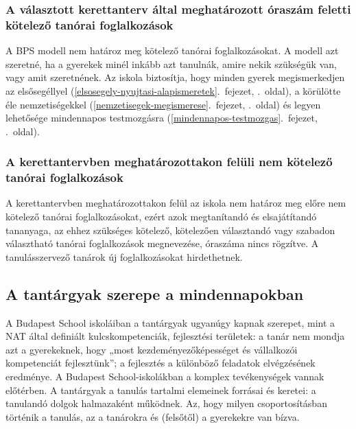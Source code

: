 \hypertarget{a-valasztott-kerettanterv-altal-meghatarozott-oraszam-feletti-kotelezo-tanorai-foglalkozasok}{%
\subsubsection{A választott kerettanterv által meghatározott óraszám
feletti kötelező tanórai
foglalkozások}\label{a-valasztott-kerettanterv-altal-meghatarozott-oraszam-feletti-kotelezo-tanorai-foglalkozasok}}

A BPS modell nem határoz meg kötelező tanórai foglalkozásokat. A modell
azt szeretné, ha a gyerekek minél inkább azt tanulnák, amire nekik
szükségük van, vagy amit szeretnének. Az iskola biztosítja, hogy minden
gyerek megismerkedjen az
elsősegéllyel (\ref{elsosegely-nyujtasi-alapismeretek}.~fejezet, \pageref{elsosegely-nyujtasi-alapismeretek}.~oldal),
a körülötte éle
nemzetiségekkel (\ref{nemzetisegek-megismerese}.~fejezet, \pageref{nemzetisegek-megismerese}.~oldal)
és legyen lehetősége
mindennapos testmozgásra (\ref{mindennapos-testmozgas}.~fejezet, \pageref{mindennapos-testmozgas}.~oldal).

\hypertarget{a-kerettantervben-meghatarozottakon-felul-a-nem-kotelezo-tanorai-foglalkozasok}{%
\subsubsection{A kerettantervben meghatározottakon felüli nem kötelező
tanórai
foglalkozások}\label{a-kerettantervben-meghatarozottakon-felul-a-nem-kotelezo-tanorai-foglalkozasok}}

A kerettantervben meghatározottakon felül az iskola nem határoz meg
előre nem kötelező tanórai foglalkozásokat, ezért azok megtanítandó és
elsajátítandó tananyaga, az ehhez szükséges kötelező, kötelezően
választandó vagy szabadon választható tanórai foglalkozások megnevezése,
óraszáma nincs rögzítve. A tanulásszervező tanárok új foglalkozásokat
hirdethetnek.

\hypertarget{a-tantargyak-szerepe-a-mindennapokban}{%
\subsection{A tantárgyak szerepe a
mindennapokban}\label{a-tantargyak-szerepe-a-mindennapokban}}

A Budapest School iskoláiban a tantárgyak ugyanúgy kapnak szerepet, mint
a NAT által definiált kulcskompetenciák, fejlesztési területek: a tanár
nem mondja azt a gyerekeknek, hogy „most kezdeményezőképességet és
vállalkozói kompetenciát fejlesztünk''; a fejlesztés a különböző feladatok
elvégzésének eredménye. A Budapest School-iskolákban a komplex tevékenységek vannak előtérben. A tantárgyak a
tanulás tartalmi elemeinek forrásai és keretei: a tanulandó dolgok
halmazaként működnek. Az, hogy milyen csoportosításban történik a
tanulás, az a tanárokra és (felsőtől) a gyerekekre van bízva.

